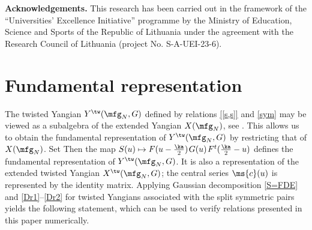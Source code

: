 \documentclass{amsart}
\numberwithin{equation}{section}
\theoremstyle{remark}
\renewcommand{\,}{\kern 0.1em} %
\begin{document}


{\noindent \bf Acknowledgements.} This research has been carried out in the framework of the “Universities’ Excellence Initiative” programme by the Ministry of Education, Science and Sports of the Republic of Lithuania under the agreement with the Research Council of Lithuania (project No. S-A-UEI-23-6).







\appendix


\section{Fundamental representation} \label{app:Rep}



The twisted Yangian $Y^\tw(\mfg_N,G)$ defined by relations \eqref{[s,s]} and \eqref{sym} may be viewed as a subalgebra of the extended Yangian $X(\mfg_N)$, see \cite[\S3.2]{GR16}. This allows us to obtain the fundamental representation of $Y^\tw(\mfg_N,G)$ by restricting that of $X(\mfg_N)$. 
Set
Then the map $S(u) \mapsto F(u-\tfrac\ka2)\,G(u)\,F^t(\tfrac\ka2-u)$ defines the fundamental representation of $Y^\tw(\mfg_N,G)$. It is also a representation of the extended twisted Yangian $X^\tw(\mfg_N,G)$; the central series $\ms{c}(u)$ is represented by the identity matrix. 
Applying Gaussian decomposition \eqref{S=FDE} and \eqref{Dr1}--\eqref{Dr2} for twisted Yangians associated with the split symmetric pairs yields the following statement, which can be used to verify relations presented in this paper numerically.
\end{document}
